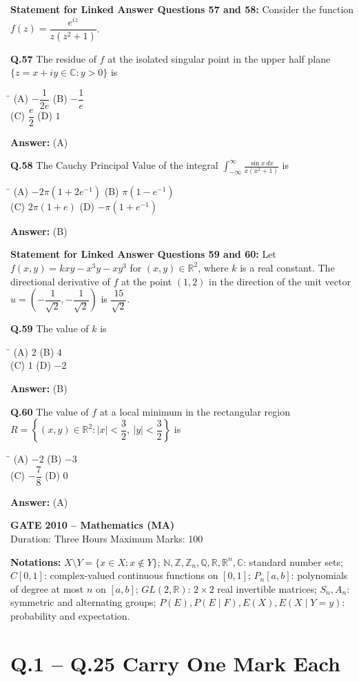\documentclass[11pt,a4paper]{article}
\newcommand{\optsfourA}[4]{%
  \begin{tabbing}
    \hspace{0.48\linewidth}\=\kill
    (A) #1 \> (B) #2 \\[2pt]
    (C) #3 \> (D) #4
  \end{tabbing}%
}
\newcommand{\ans}[1]{\textbf{Answer:} #1\par\medskip}
\begin{document}
\textbf{Statement for Linked Answer Questions 57 and 58:}
Consider the function $f(z) = \dfrac{e^{iz}}{z(z^2 + 1)}$.

\textbf{Q.57} The residue of $f$ at the isolated singular point in the upper half plane $\{z = x + iy \in \mathbb{C} : y > 0\}$ is
\optsfourA{$-\dfrac{1}{2e}$}{$-\dfrac{1}{e}$}{$\dfrac{e}{2}$}{$1$}
\ans{(A)}

\textbf{Q.58} The Cauchy Principal Value of the integral $\displaystyle\int_{-\infty}^{\infty} \frac{\sin x\,dx}{x(x^2 + 1)}$ is
\optsfourA{$-2\pi(1 + 2e^{-1})$}{$\pi(1 - e^{-1})$}{$2\pi(1 + e)$}{$-\pi(1 + e^{-1})$}
\ans{(B)}

\medskip
\textbf{Statement for Linked Answer Questions 59 and 60:}
Let $f(x, y) = kxy - x^3 y - xy^3$ for $(x, y) \in \mathbb{R}^2$, where $k$ is a real constant. The directional derivative of $f$ at the point $(1, 2)$ in the direction of the unit vector $u = \left(-\dfrac{1}{\sqrt{2}}, -\dfrac{1}{\sqrt{2}}\right)$ is $\dfrac{15}{\sqrt{2}}$.

\textbf{Q.59} The value of $k$ is
\optsfourA{$2$}{$4$}{$1$}{$-2$}
\ans{(B)}

\textbf{Q.60} The value of $f$ at a local minimum in the rectangular region $R = \left\{(x, y) \in \mathbb{R}^2 : |x| < \dfrac{3}{2},\ |y| < \dfrac{3}{2}\right\}$ is
\optsfourA{$-2$}{$-3$}{$-\dfrac{7}{8}$}{$0$}
\ans{(A)}

\newpage


\begin{center}
  {\Large\bfseries GATE 2010 -- Mathematics (MA)}\\[4pt]
  {\small Duration: Three Hours \quad\textbar\quad Maximum Marks: 100}
\end{center}

\medskip
\textbf{Notations:} $X \setminus Y = \{x \in X : x \notin Y\}$; $\mathbb{N}, \mathbb{Z}, \mathbb{Z}_n, \mathbb{Q}, \mathbb{R}, \mathbb{R}^n, \mathbb{C}$: standard number sets; $C[0,1]$: complex-valued continuous functions on $[0,1]$; $P_n[a,b]$: polynomials of degree at most $n$ on $[a,b]$; $GL(2, \mathbb{R})$: $2 \times 2$ real invertible matrices; $S_n, A_n$: symmetric and alternating groups; $P(E), P(E \mid F), E(X), E(X \mid Y = y)$: probability and expectation.

\section*{Q.1 -- Q.25 Carry One Mark Each}
\end{document}
